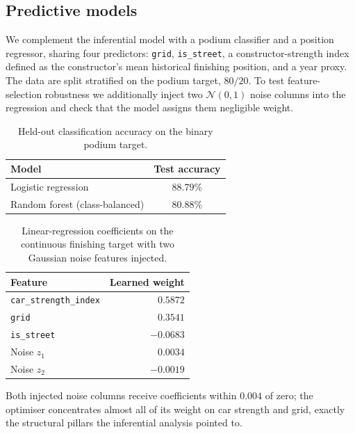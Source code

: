\documentclass[11pt,a4paper]{article}
\newcommand{\dnorm}{\mathcal{N}}
\newcommand{\code}[1]{\texttt{\small #1}}
\theoremstyle{remark}
\begin{document}
\subsection{Predictive models}
We complement the inferential model with a podium classifier and a
position regressor, sharing four predictors: \code{grid},
\code{is\_street}, a constructor-strength index defined as the
constructor's mean historical finishing position, and a year proxy.
The data are split stratified on the podium target, $80/20$. To
test feature-selection robustness we additionally inject two
$\dnorm(0,1)$ noise columns into the regression and check that the
model assigns them negligible weight.

\begin{table}[H]
  \centering
  \caption{Held-out classification accuracy on the binary podium target.}
  \label{tab:podium-cls}
  \begin{tabular}{lc}
    \toprule
    Model & Test accuracy \\
    \midrule
    Logistic regression                  & $88.79\%$ \\
    Random forest (class-balanced)       & $80.88\%$ \\
    \bottomrule
  \end{tabular}
\end{table}

\begin{table}[H]
  \centering
  \caption{Linear-regression coefficients on the continuous finishing target with two Gaussian noise features injected.}
  \label{tab:noise-cols}
  \begin{tabular}{lr}
    \toprule
    Feature & Learned weight \\
    \midrule
    \code{car\_strength\_index} & $\phantom{-}0.5872$ \\
    \code{grid}                 & $\phantom{-}0.3541$ \\
    \code{is\_street}           & $-0.0683$ \\
    Noise $z_1$                 & $\phantom{-}0.0034$ \\
    Noise $z_2$                 & $-0.0019$ \\
    \bottomrule
  \end{tabular}
\end{table}

Both injected noise columns receive coefficients within $0.004$ of
zero; the optimiser concentrates almost all of its weight on car
strength and grid, exactly the structural pillars the inferential
analysis pointed to.
\end{document}
